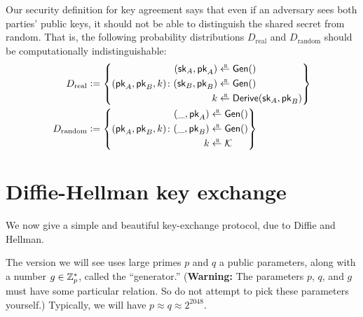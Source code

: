 Our security definition for key agreement says that even
if an adversary sees both parties' public keys, it should
not be able to distinguish the shared secret from random.
That is, the following probability distributions
$D_\text{real}$ and $D_\text{random}$ should be 
computationally indistinguishable:
\begin{align*}
  D_\text{real} &\deq \left\{ 
(\pk_A, \pk_B, k) \colon  \begin{aligned}
  (\sk_A, \pk_A) &\getsr \Gen()\\
  (\sk_B, \pk_B) &\getsr \Gen()\\
  k &\getsr \Derive(\sk_A, \pk_B)
\end{aligned}
\right\} \\
  D_\text{random} &\deq \left\{ (\pk_A, \pk_B, k) \colon  \begin{aligned}
  (\_, \pk_A) &\getsr \Gen()\\
  (\_, \pk_B) &\getsr \Gen()\\
  k &\getsr \calK 
\end{aligned}
  \right\}
\end{align*}


\section{Diffie-Hellman key exchange}
We now give a simple and beautiful key-exchange protocol, 
due to Diffie and Hellman.

The version we will see uses large primes $p$ 
and $q$ a public parameters, along with a number $g \in \mathbb{Z}^*_p$,
called the ``generator.''
(\textbf{Warning:} The parameters $p$, $q$, and $g$ must have
some particular relation. So do not attempt to pick these parameters
yourself.)
Typically, we will have $p \approx q \approx 2^{2048}$.

